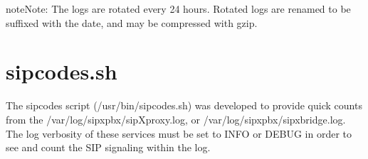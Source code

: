 \documentclass[letterpaper,10pt,english]{sphinxmanual}
\begin{document}
\begin{sphinxadmonition}{note}{Note:}
The logs are rotated every 24 hours. Rotated logs are renamed to be suffixed with the date, and may be compressed with gzip.
\end{sphinxadmonition}


\section{sipcodes.sh}
\label{\detokenize{troubleshooting:sipcodes-sh}}\label{\detokenize{troubleshooting:sipcodes}}
The sipcodes script (/usr/bin/sipcodes.sh) was developed to provide quick counts from the /var/log/sipxpbx/sipXproxy.log, or /var/log/sipxpbx/sipxbridge.log.
The log verbosity of these services must be set to INFO or DEBUG in order to see and count the SIP signaling within the log.
\end{document}
